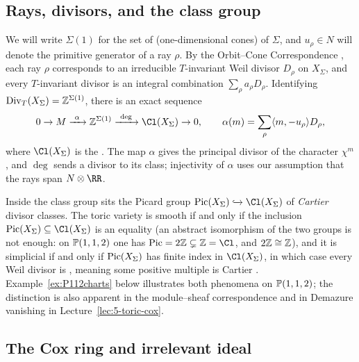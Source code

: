 \documentclass{amsart}
\begin{document}
\subsection{Rays, divisors, and the class group}

We will write $\Sigma(1)$ for the set of  (one-dimensional cones) of $\Sigma$, and $u_\rho\in N$ will denote the primitive generator of a ray $\rho$. By the Orbit--Cone Correspondence \cite[\S3.2]{CLS2011}, each ray $\rho$ corresponds to an irreducible $T$-invariant Weil divisor $D_\rho$ on $X_\Sigma$, and every $T$-invariant divisor is an integral combination $\sum_\rho a_\rho D_\rho$. Identifying $\operatorname{Div}_T(X_\Sigma)=\mathbb Z^{\Sigma(1)}$, there is an exact sequence \cite[Thm.~4.1.3]{CLS2011}
\begin{equation}\label{eqn:SEScl4}
  0\to M\xrightarrow{\ \alpha\ } \ZZ^{\Sigma(1)}\xrightarrow{\ \deg\ } \Cl(X_\Sigma)\to 0,
  \qquad \alpha(m)=\sum_\rho \langle m,-u_\rho\rangle D_\rho,
\end{equation}
where $\Cl(X_\Sigma)$ is the . The map $\alpha$ gives the principal divisor of the character $\chi^m$, and $\deg$ sends a divisor to its class; injectivity of $\alpha$ uses our assumption that the rays span $N\otimes\RR$.

\begin{remark}\label{rem:PicCl}
  Inside the class group sits the Picard group $\Pic(X_\Sigma) \xhookrightarrow{} \Cl(X_\Sigma)$ of \emph{Cartier} divisor classes.
  The toric variety is smooth if and only if the inclusion $\Pic(X_\Sigma)\subseteq\Cl(X_\Sigma)$ is an equality (an abstract isomorphism of the two groups is not enough: on $\mathbb P(1,1,2)$ one has $\Pic = 2\ZZ\subsetneq\ZZ = \Cl$, and $2\mathbb Z\cong\mathbb Z$), and it is simplicial if and only if $\operatorname{Pic}(X_\Sigma)$ has finite index in $\Cl(X_\Sigma)$, in which case every Weil divisor is , meaning some positive multiple is Cartier \cite[Prop.~4.2.6, 4.2.7]{CLS2011}. Example~\ref{ex:P112charts} below illustrates both phenomena on $\mathbb P(1,1,2)$; the distinction is also apparent in the module--sheaf correspondence and in Demazure vanishing in Lecture~\ref{lec:5-toric-cox}.
\end{remark}

\subsection{The Cox ring and irrelevant ideal}
\end{document}
